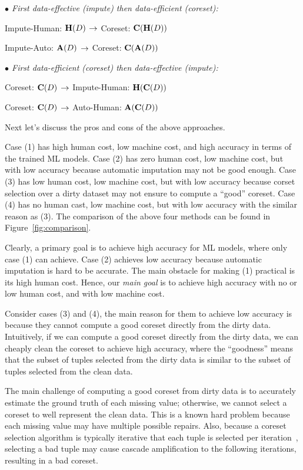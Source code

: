 \stab
\textit{$\bullet$ First data-effective (impute) then data-efficient (coreset):}

\bi
	\item[(1)] Impute-Human: $\mathbf{H}(D)$ $\rightarrow$ Coreset:  $\mathbf{C}(\mathbf{H}(D))$
	\item[(2)] Impute-Auto: $\mathbf{A}(D)$ $\rightarrow$ Coreset: $\mathbf{C}(\mathbf{A}(D))$
\ei

\stab
\textit{$\bullet$ First data-efficient (coreset) then data-effective (impute):}

\bi
	\item[(3)] Coreset: $\mathbf{C}(D)$ $\rightarrow$ Impute-Human: $\mathbf{H}(\mathbf{C}(D))$
	\item[(4)] Coreset: $\mathbf{C}(D)$ $\rightarrow$ Auto-Human: $\mathbf{A}(\mathbf{C}(D))$  
\ei

Next let's discuss the pros and cons of the above approaches. 

Case (1) has high human cost, low machine cost, and high accuracy in terms of the trained ML models.
%
Case (2) has zero human cost, low machine cost, but with low accuracy because automatic imputation may not be good enough.
%
Case (3) has low human cost, low machine cost, but with low accuracy because corset selection over a dirty dataset may not ensure to compute a ``good'' coreset. 
%
Case (4) has no human cast, low machine cost, but with low accuracy with the similar reason as  (3).
%
The comparison of the above four methods can be found in Figure~\ref{fig:comparison}.


 Clearly, a primary goal is to achieve high accuracy for ML models, where only case (1) can achieve. 
Case (2) achieves low accuracy because automatic imputation is hard to be accurate.
The main obstacle for making (1) practical is its high human cost. 
Hence, our \textit{main goal} is to achieve high accuracy with no or low human cost, and with low machine cost.

Consider cases (3) and (4), the main reason for them to achieve low accuracy is because they cannot compute a good coreset directly from the dirty data. Intuitively, if we can compute a good coreset directly from the dirty data, we can cheaply clean the coreset to achieve high accuracy, where the ``goodness'' means that the subset of tuples selected from the dirty data is similar to the subset of tuples selected from the clean data.

The main challenge of computing a good coreset from dirty data is to accurately estimate the ground truth of each missing value; otherwise, we cannot select a coreset to well represent the clean data. This is a known hard problem because each missing value may have multiple possible repairs. Also, because a coreset selection algorithm is typically iterative that each tuple is selected per iteration~\cite{DBLP:conf/icml/MirzasoleimanBL20}, selecting a bad tuple may cause cascade amplification to the following iterations, resulting in a bad coreset.


